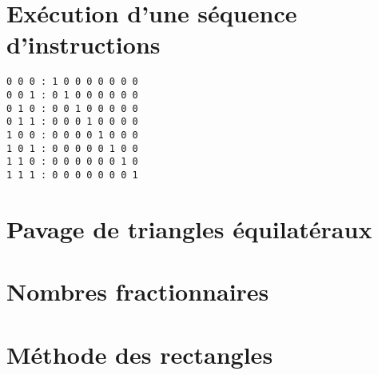 \documentclass[11pt,a4paper]{article}
\begin{document}

\section{Exécution d'une séquence d'instructions}
%

\begin{py}{8cm}
\begin{verbatim}
0 0 0 : 1 0 0 0 0 0 0 0
0 0 1 : 0 1 0 0 0 0 0 0
0 1 0 : 0 0 1 0 0 0 0 0
0 1 1 : 0 0 0 1 0 0 0 0
1 0 0 : 0 0 0 0 1 0 0 0
1 0 1 : 0 0 0 0 0 1 0 0
1 1 0 : 0 0 0 0 0 0 1 0
1 1 1 : 0 0 0 0 0 0 0 1
\end{verbatim}
\end{py}

\section{Pavage de triangles équilatéraux}


\section{Nombres fractionnaires}


\section{Méthode des rectangles}



\label{fini}
\end{document}
